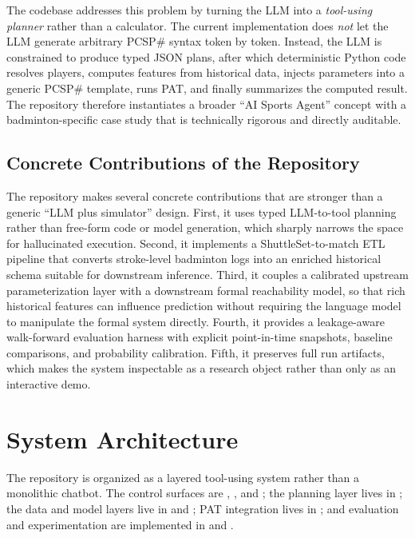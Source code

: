 \documentclass{article}
\begin{document}
The codebase addresses this problem by turning the LLM into a \emph{tool-using planner} rather than a calculator. The current implementation does \emph{not} let the LLM generate arbitrary PCSP\# syntax token by token. Instead, the LLM is constrained to produce typed JSON plans, after which deterministic Python code resolves players, computes features from historical data, injects parameters into a generic PCSP\# template, runs PAT, and finally summarizes the computed result. The repository therefore instantiates a broader ``AI Sports Agent'' concept with a badminton-specific case study that is technically rigorous and directly auditable.

\subsection*{Concrete Contributions of the Repository}
The repository makes several concrete contributions that are stronger than a generic ``LLM plus simulator'' design. First, it uses typed LLM-to-tool planning rather than free-form code or model generation, which sharply narrows the space for hallucinated execution. Second, it implements a ShuttleSet-to-match ETL pipeline that converts stroke-level badminton logs into an enriched historical schema suitable for downstream inference. Third, it couples a calibrated upstream parameterization layer with a downstream formal reachability model, so that rich historical features can influence prediction without requiring the language model to manipulate the formal system directly. Fourth, it provides a leakage-aware walk-forward evaluation harness with explicit point-in-time snapshots, baseline comparisons, and probability calibration. Fifth, it preserves full run artifacts, which makes the system inspectable as a research object rather than only as an interactive demo.

\section{System Architecture}
The repository is organized as a layered tool-using system rather than a monolithic chatbot. The control surfaces are , , and ; the planning layer lives in ; the data and model layers live in  and ; PAT integration lives in ; and evaluation and experimentation are implemented in  and .
\end{document}
